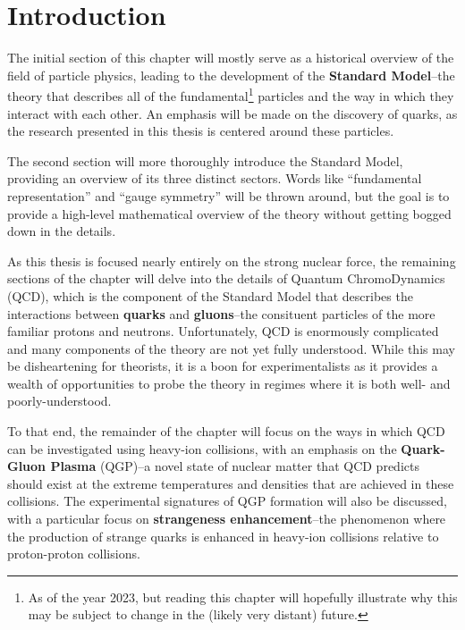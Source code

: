 \chapter{Introduction}
\label{ch:introduction}

The initial section of this chapter will mostly serve as a historical overview of the field of particle physics, leading to the development of the \textbf{Standard Model}--the theory that describes all of the fundamental\footnote{As of the year 2023, but reading this chapter will hopefully illustrate why this may be subject to change in the (likely very distant) future.} particles and the way in which they interact with each other. An emphasis will be made on the discovery of quarks, as the research presented in this thesis is centered around these particles.

The second section will more thoroughly introduce the Standard Model, providing an overview of its three distinct sectors.  Words like ``fundamental representation'' and ``gauge symmetry'' will be thrown around, but the goal is to provide a high-level mathematical overview of the theory without getting bogged down in the details.

As this thesis is focused nearly entirely on the strong nuclear force, the remaining sections of the chapter will delve into the details of Quantum ChromoDynamics (QCD), which is the component of the Standard Model that describes the interactions between \textbf{quarks} and \textbf{gluons}--the consituent particles of the more familiar protons and neutrons. Unfortunately, QCD is enormously complicated and many components of the theory are not yet fully understood. While this may be disheartening for theorists, it is a boon for experimentalists as it provides a wealth of opportunities to probe the theory in regimes where it is both well- and poorly-understood.

To that end, the remainder of the chapter will focus on the ways in which QCD can be investigated using heavy-ion collisions, with an emphasis on the \textbf{Quark-Gluon Plasma} (QGP)--a novel state of nuclear matter that QCD predicts should exist at the extreme temperatures and densities that are achieved in these collisions. The experimental signatures of QGP formation will also be discussed, with a particular focus on \textbf{strangeness enhancement}--the phenomenon where the production of strange quarks is enhanced in heavy-ion collisions relative to proton-proton collisions. 

\clearpage

